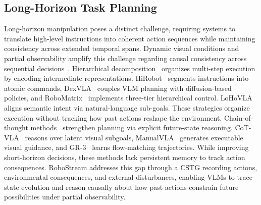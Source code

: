 \subsection{Long-Horizon Task Planning}
Long-horizon manipulation poses a distinct challenge, requiring systems to translate high-level instructions into coherent action sequences while maintaining consistency across extended temporal spans. Dynamic visual conditions and partial observability amplify this challenge regarding causal consistency across sequential decisions~\cite{hanrobocerebra}.
Hierarchical decomposition~\cite{shi2024yell, belkhale2024rt, lihamster} organizes multi-step execution by encoding intermediate representations. HiRobot~\cite{shi2025hi} segments instructions into atomic commands, DexVLA~\cite{wen2025dexvla} couples VLM planning with diffusion-based policies, and RoboMatrix~\cite{mao2024robomatrix} implements three-tier hierarchical control. LoHoVLA~\cite{yang2025lohovla} aligns semantic intent via natural-language sub-goals. These strategies organize execution without tracking how past actions reshape the environment.
Chain-of-thought methods~\cite{wei2022chain, mu2023embodiedgpt, zawalski2025robotic, zhang2025learning} strengthen planning via explicit future-state reasoning. CoT-VLA~\cite{zhao2025cot} reasons over latent visual subgoals, ManualVLA~\cite{gu2025manualvla} generates executable visual guidance, and GR-3~\cite{cheang2025gr} learns flow-matching trajectories. While improving short-horizon decisions, these methods lack persistent memory to track action consequences.
RoboStream addresses this gap through a CSTG recording actions, environmental consequences, and external disturbances, enabling VLMs to trace state evolution and reason causally about how past actions constrain future possibilities under partial observability.
